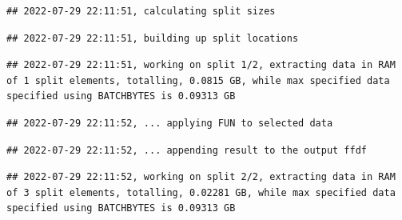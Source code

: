 \documentclass[
  12pt,
]{style/krantz}
\newenvironment{Shaded}{\begin{snugshade}}{\end{snugshade}}
\newcommand{\AttributeTok}[1]{\textcolor[rgb]{0.77,0.63,0.00}{#1}}
\newcommand{\CommentTok}[1]{\textcolor[rgb]{0.56,0.35,0.01}{\textit{#1}}}
\newcommand{\ConstantTok}[1]{\textcolor[rgb]{0.00,0.00,0.00}{#1}}
\newcommand{\ControlFlowTok}[1]{\textcolor[rgb]{0.13,0.29,0.53}{\textbf{#1}}}
\newcommand{\DecValTok}[1]{\textcolor[rgb]{0.00,0.00,0.81}{#1}}
\newcommand{\FunctionTok}[1]{\textcolor[rgb]{0.00,0.00,0.00}{#1}}
\newcommand{\NormalTok}[1]{#1}
\newcommand{\OtherTok}[1]{\textcolor[rgb]{0.56,0.35,0.01}{#1}}
\newcommand{\SpecialCharTok}[1]{\textcolor[rgb]{0.00,0.00,0.00}{#1}}
\begin{document}
\begin{Shaded}
\end{Shaded}

\begin{verbatim}
## 2022-07-29 22:11:51, calculating split sizes
\end{verbatim}

\begin{verbatim}
## 2022-07-29 22:11:51, building up split locations
\end{verbatim}

\begin{verbatim}
## 2022-07-29 22:11:51, working on split 1/2, extracting data in RAM of 1 split elements, totalling, 0.0815 GB, while max specified data specified using BATCHBYTES is 0.09313 GB
\end{verbatim}

\begin{verbatim}
## 2022-07-29 22:11:52, ... applying FUN to selected data
\end{verbatim}

\begin{verbatim}
## 2022-07-29 22:11:52, ... appending result to the output ffdf
\end{verbatim}

\begin{verbatim}
## 2022-07-29 22:11:52, working on split 2/2, extracting data in RAM of 3 split elements, totalling, 0.02281 GB, while max specified data specified using BATCHBYTES is 0.09313 GB
\end{verbatim}
\end{document}
